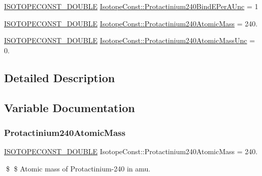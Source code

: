 \begin{DoxyCompactItemize}
\item 
\mbox{\hyperlink{group___isotope_const-_macros_ga8f45a7272ce02c0b4c65c44636ed719a}{I\+S\+O\+T\+O\+P\+E\+C\+O\+N\+S\+T\+\_\+\+D\+O\+U\+B\+LE}} \mbox{\hyperlink{group___isotope_const-_protactinium-_pa240_gaf999d7fb1e70fa91a2d19c021b1dc2a8}{Isotope\+Const\+::\+Protactinium240\+Bind\+E\+Per\+A\+Unc}} = 1
\item 
\mbox{\hyperlink{group___isotope_const-_macros_ga8f45a7272ce02c0b4c65c44636ed719a}{I\+S\+O\+T\+O\+P\+E\+C\+O\+N\+S\+T\+\_\+\+D\+O\+U\+B\+LE}} \mbox{\hyperlink{group___isotope_const-_protactinium-_pa240_ga49eba2bef20dfeffaaa96cb10793a71c}{Isotope\+Const\+::\+Protactinium240\+Atomic\+Mass}} = 240.
\item 
\mbox{\hyperlink{group___isotope_const-_macros_ga8f45a7272ce02c0b4c65c44636ed719a}{I\+S\+O\+T\+O\+P\+E\+C\+O\+N\+S\+T\+\_\+\+D\+O\+U\+B\+LE}} \mbox{\hyperlink{group___isotope_const-_protactinium-_pa240_ga1ae4f1200e953802290f8fcd0ec6eeb1}{Isotope\+Const\+::\+Protactinium240\+Atomic\+Mass\+Unc}} = 0.
\end{DoxyCompactItemize}


\subsection{Detailed Description}


\subsection{Variable Documentation}
\mbox{\label{group___isotope_const-_protactinium-_pa240_ga49eba2bef20dfeffaaa96cb10793a71c}} 
\subsubsection{\texorpdfstring{Protactinium240\+Atomic\+Mass}{Protactinium240AtomicMass}}
{\footnotesize\ttfamily \mbox{\hyperlink{group___isotope_const-_macros_ga8f45a7272ce02c0b4c65c44636ed719a}{I\+S\+O\+T\+O\+P\+E\+C\+O\+N\+S\+T\+\_\+\+D\+O\+U\+B\+LE}} Isotope\+Const\+::\+Protactinium240\+Atomic\+Mass = 240.}

\$ \$ Atomic mass of Protactinium-\/240 in amu. \mbox{\label{group___isotope_const-_protactinium-_pa240_ga1ae4f1200e953802290f8fcd0ec6eeb1}} 
